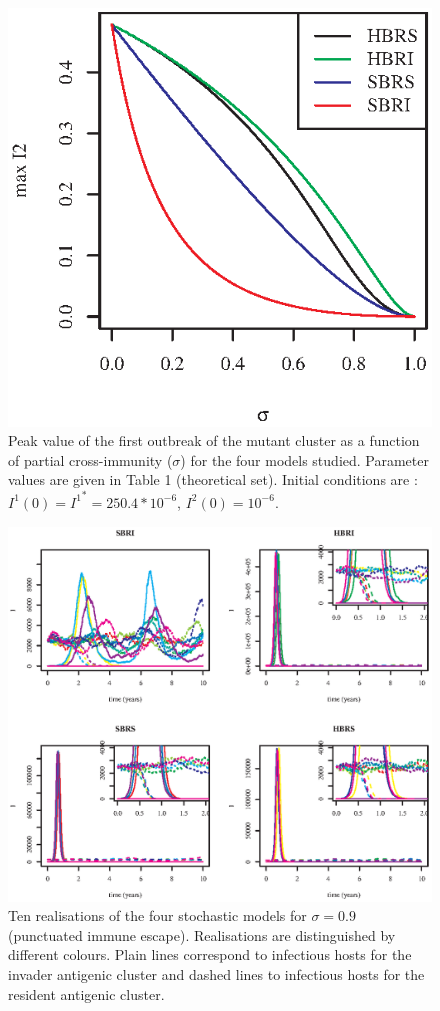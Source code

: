 \begin{figure}[!h]
\center
	\includegraphics[]{graphs/article1/max_theoretical12.eps}
        \caption{Peak value of the first outbreak of the mutant
          cluster as a function of partial cross-immunity ($\sigma$)
          for the four models studied. Parameter values are given in
          Table 1 (theoretical set). Initial conditions are :
          ${I^1}(0) = {I^1}^*=250.4*10^{-6}$, ${I^2}(0)=10^{-6}$.}
\label{fig:max_theo}
\end{figure}


\begin{figure}[!h]
  \center
    \includegraphics[width=0.8\linewidth]{graphs/article1/traj_sto_drift_theo.eps}
    \caption{Ten realisations of the four stochastic
      models for $\sigma = 0.9$ (punctuated immune escape).
      Realisations are distinguished by different colours. Plain lines
      correspond to infectious hosts for the invader antigenic cluster
      and dashed lines to infectious hosts for the resident antigenic
      cluster.}
\label{fig:sto_drift}
\end{figure}

